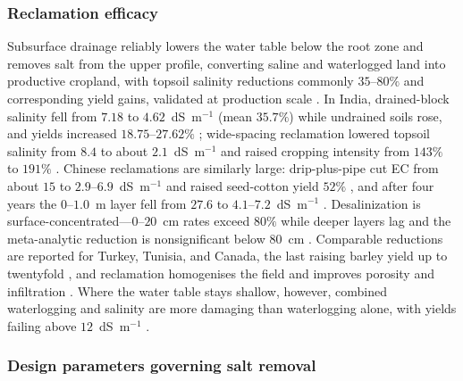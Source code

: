\subsubsection{Reclamation efficacy}

Subsurface drainage reliably lowers the water table below the root zone and
removes salt from the upper profile, converting saline and waterlogged land into
productive cropland, with topsoil salinity reductions commonly $35$--$80\%$ and
corresponding yield gains, validated at production scale
\parencite{Yang2025,Derby2024}. In India, drained-block salinity fell from
$7.18$ to $4.62$~dS~m$^{-1}$ (mean $35.7\%$) while undrained soils rose, and
yields increased $18.75$--$27.62\%$ \parencite{Sharma2006}; wide-spacing
reclamation lowered topsoil salinity from $8.4$ to about $2.1$~dS~m$^{-1}$ and
raised cropping intensity from $143\%$ to $191\%$ \parencite{Manjunatha2004}.
Chinese reclamations are similarly large: drip-plus-pipe cut EC from about
$15$ to $2.9$--$6.9$~dS~m$^{-1}$ and raised seed-cotton yield $52\%$
\parencite{Heng2021}, and after four years the $0$--$1.0$~m layer fell from
$27.6$ to $4.1$--$7.2$~dS~m$^{-1}$ \parencite{Zhang2021}. Desalinization
is surface-concentrated---$0$--$20$~cm rates exceed $80\%$ while deeper layers
lag and the meta-analytic reduction is nonsignificant below $80$~cm
\parencite{Han2023,Yang2025}. Comparable reductions are reported for Turkey,
Tunisia, and Canada, the last raising barley yield up to twentyfold
\parencite{Bahçeci2009,HajAmor2019,Steppuhn2006,Steppuhn2017}, and reclamation
homogenises the field and improves porosity and infiltration
\parencite{Yu2015,Yu2025,Sharma2000}. Where the water table stays shallow,
however, combined waterlogging and salinity are more damaging than waterlogging
alone, with yields failing above $12$~dS~m$^{-1}$ \parencite{Kahlown2002}.

\subsubsection{Design parameters governing salt removal}

